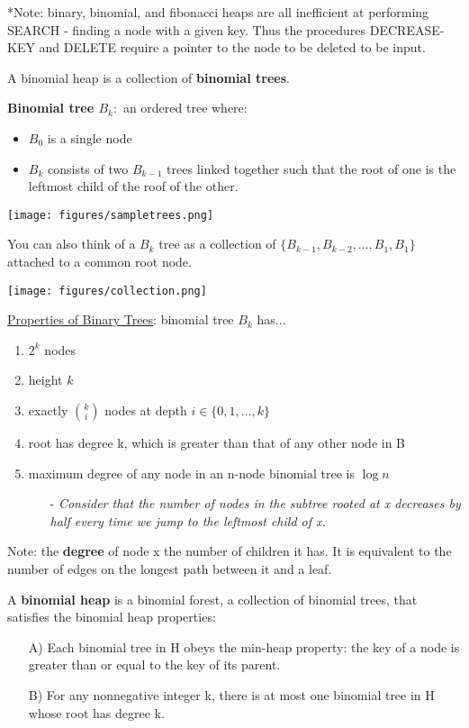 \documentclass[12pt]{article}
\begin{document}
*Note: binary, binomial, and fibonacci heaps are all inefficient at performing SEARCH - finding a node with a given key. Thus the procedures DECREASE-KEY and DELETE require a pointer to the node to be deleted to be input.

A binomial heap is a collection of \textbf{binomial trees}.

\textbf{Binomial tree $B_k :$} an ordered tree where:
	\begin{itemize}
	\item $B_0$ is a single node
	\item $B_k$ consists of two $B_{k-1}$ trees linked together such that the root of one is the leftmost child of the roof of the other.
	\end{itemize}
	
\begin{center}
\texttt{[image: figures/sampletrees.png]}
\vspace{0.5cm}

You can also think of a $B_k$ tree as a collection of $\{B_{k-1}, B_{k-2}, ... , B_1, B_1\}$ attached to a common root node.

\texttt{[image: figures/collection.png]}
\end{center}
\underline{Properties of Binary Trees}: binomial tree $B_k$ has...
	\begin{enumerate}
	\item $2^k$ nodes
	\item height $k$
	\item exactly $\binom{k}{i}$ nodes at depth $i \in \{0,1,...,k\}$
	\item root has degree k, which is greater than that of any other node in B
	\item maximum degree of any node in an n-node binomial tree is $\log{n}$
		\begin{itemize}
		\item [-]\emph{Consider that the number of nodes in the subtree rooted at x decreases by half every time we jump to the leftmost child of x.}
		\end{itemize}

	\end{enumerate}
\vspace{0.5cm}

Note: the \textbf{degree} of node x the number of children it has. It is equivalent to the number of edges on the longest path between it and a leaf.

A \textbf{binomial heap} is a binomial forest, a collection of binomial trees, that satisfies the binomial heap properties:
	\begin{itemize}
	\item [A)]Each binomial tree in H obeys the min-heap property: the key of a node is greater than or equal to the key of its parent.
	\item [B)]For any nonnegative integer k, there is at most one binomial tree in H whose root has degree k.
	\end{itemize}
\end{document}
